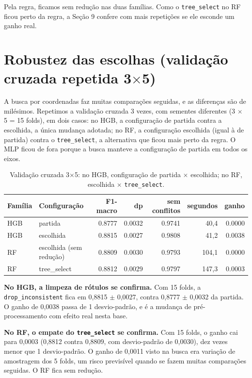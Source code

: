 \documentclass[11pt,a4paper]{article}
\begin{document}
Pela regra, ficamos sem redução nas duas famílias. Como o \texttt{tree\_select} no RF ficou perto da regra, a Seção 9 confere com mais repetições se ele esconde um ganho real.

\section{Robustez das escolhas (validação cruzada repetida 3$\times$5)}

A busca por coordenadas faz muitas comparações seguidas, e as diferenças são de milésimos. Repetimos a validação cruzada 3 vezes, com sementes diferentes (3 $\times$ 5 = 15 folds), em dois casos: no HGB, a configuração de partida contra a escolhida, a única mudança adotada; no RF, a configuração escolhida (igual à de partida) contra o \texttt{tree\_select}, a alternativa que ficou mais perto da regra. O MLP ficou de fora porque a busca manteve a configuração de partida em todos os eixos.

\begin{table}[H]
\centering
\caption{Validação cruzada 3$\times$5: no HGB, configuração de partida $\times$ escolhida; no RF, escolhida $\times$ \texttt{tree\_select}.}
\begin{tabular}{llrrrrr}
\toprule
Família & Configuração & F1-macro & dp & sem conflitos & segundos & ganho \\
\midrule
HGB & partida & 0.8777 & 0.0032 & 0.9741 & 40,4 & 0.0000 \\
HGB & escolhida & 0.8815 & 0.0027 & 0.9808 & 41,2 & 0.0038 \\
\midrule
RF & escolhida (sem redução) & 0.8809 & 0.0030 & 0.9793 & 104,1 & 0.0000 \\
RF & tree\_select & 0.8812 & 0.0029 & 0.9797 & 147,3 & 0.0003 \\
\bottomrule
\end{tabular}
\end{table}

\textbf{No HGB, a limpeza de rótulos se confirma.} Com 15 folds, a \texttt{drop\_inconsistent} fica em 0,8815 $\pm$ 0,0027, contra 0,8777 $\pm$ 0,0032 da partida. O ganho de 0,0038 passa de 1 desvio-padrão, e é a mudança de pré-processamento com efeito real nesta base.

\textbf{No RF, o empate do \texttt{tree\_select} se confirma.} Com 15 folds, o ganho cai para 0,0003 (0,8812 contra 0,8809, com desvio-padrão de 0,0030), dez vezes menor que 1 desvio-padrão. O ganho de 0,0011 visto na busca era variação de amostragem dos 5 folds, um risco previsível quando se fazem muitas comparações seguidas. O RF fica sem redução.
\end{document}
